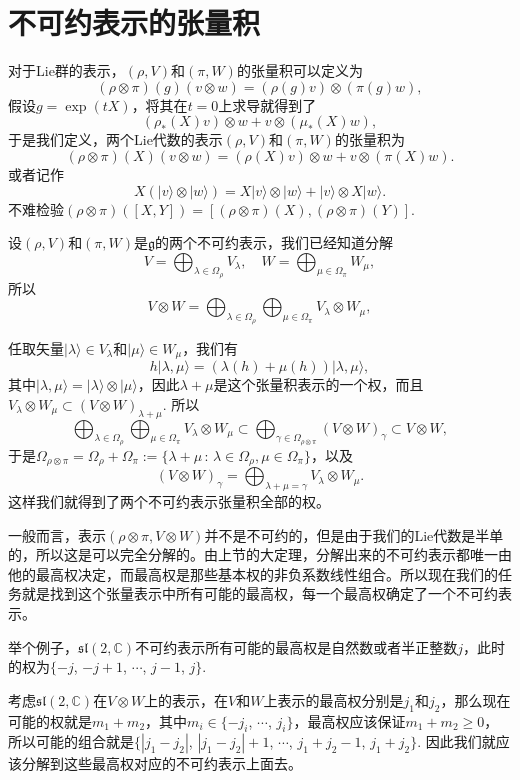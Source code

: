 \documentclass[11pt]{article}
\theoremstyle{definition}
\theoremstyle{plain}
\newcommand{\cc}{\mathbb{C}}
\newcommand{\lag}{{\mathfrak{g}}}
\begin{document}
\section{不可约表示的张量积}

对于Lie群的表示，$(\rho,V)$和$(\pi,W)$的张量积可以定义为
\[
	(\rho\otimes\pi)(g)(v\otimes w)=(\rho(g)v)\otimes(\pi(g)w),
\]
假设$g=\exp(tX)$，将其在$t=0$上求导就得到了
\[
	(\rho_*(X)v)\otimes w+ v \otimes (\mu_*(X)w),
\]
于是我们定义，两个Lie代数的表示$(\rho,V)$和$(\pi,W)$的张量积为
\[
	(\rho\otimes\pi)(X)(v\otimes w)=(\rho(X)v)\otimes w+ v \otimes (\pi(X)w).
\]
或者记作
\[
	X(|v\rangle\otimes|w\rangle)=X|v\rangle\otimes|w\rangle+|v\rangle\otimes X|w\rangle.
\]
不难检验$(\rho\otimes\pi)([X,Y])=[(\rho\otimes\pi)(X),(\rho\otimes\pi)(Y)]$.

\para 设$(\rho,V)$和$(\pi,W)$是$\lag$的两个不可约表示，我们已经知道分解
\[
	V=\bigoplus_{\lambda\in\Omega_\rho} V_\lambda,\quad W=\bigoplus_{\mu\in\Omega_\pi} W_\mu,
\]
所以
\[
	V\otimes W=\bigoplus_{\lambda\in\Omega_\rho}\bigoplus_{\mu\in\Omega_\pi} V_\lambda\otimes W_\mu,
\]

任取矢量$|\lambda\rangle\in V_\lambda$和$|\mu\rangle\in W_\mu$，我们有
\[
	h|\lambda,\mu\rangle=(\lambda(h)+\mu(h))|\lambda,\mu\rangle,
\]
其中$|\lambda,\mu\rangle=|\lambda\rangle\otimes |\mu\rangle$，因此$\lambda+\mu$是这个张量积表示的一个权，而且$V_\lambda\otimes W_\mu \subset (V\otimes W)_{\lambda+\mu}$. 所以
\[
	\bigoplus_{\lambda\in\Omega_\rho}\bigoplus_{\mu\in\Omega_\pi} V_\lambda\otimes W_\mu\subset \bigoplus_{\gamma\in \Omega_{\rho\otimes\pi}} (V\otimes W)_{\gamma}\subset V\otimes W,
\]
于是$\Omega_{\rho\otimes\pi}=\Omega_{\rho}+\Omega_{\pi}:=\{\lambda+\mu\,:\,\lambda\in\Omega_\rho,\mu\in\Omega_\pi\}$，以及
\[
	(V\otimes W)_{\gamma}=\bigoplus_{\lambda+\mu=\gamma}V_\lambda\otimes W_\mu.
\]
这样我们就得到了两个不可约表示张量积全部的权。

\para 一般而言，表示$(\rho\otimes\pi,V\otimes W)$并不是不可约的，但是由于我们的Lie代数是半单的，所以这是可以完全分解的。由上节的大定理，分解出来的不可约表示都唯一由他的最高权决定，而最高权是那些基本权的非负系数线性组合。所以现在我们的任务就是找到这个张量表示中所有可能的最高权，每一个最高权确定了一个不可约表示。

举个例子，$\mathfrak{sl}(2,\cc)$不可约表示所有可能的最高权是自然数或者半正整数$j$，此时的权为$\{-j$, $-j+1$, $\cdots$, $j-1$, $j\}$.

考虑$\mathfrak{sl}(2,\cc)$在$V\otimes W$上的表示，在$V$和$W$上表示的最高权分别是$j_1$和$j_2$，那么现在可能的权就是$m_1+m_2$，其中$m_i\in\{-j_i$, $\cdots$, $j_i\}$，最高权应该保证$m_1+m_2\geq 0$，所以可能的组合就是$\{|j_1-j_2|$, $|j_1-j_2|+1$, $\cdots$, $j_1+j_2-1$, $j_1+j_2\}$. 因此我们就应该分解到这些最高权对应的不可约表示上面去。
\end{document}
